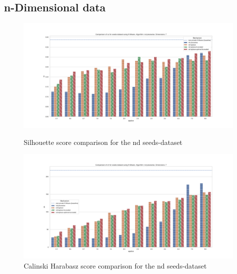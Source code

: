 \subsection{n-Dimensional data}
\begin{figure}[H]
    \centering
    \begin{minipage}[c]{0.8\textwidth}
        \includegraphics[width=1\textwidth]{Results/RQ2-nd/seeds-dataset/sc_seeds-dataset_comparison.png}
        \caption{Silhouette score comparison for the nd seeds-dataset}
        \label{fig:appendix-sc_seeds-dataset_comparison_nd}
    \end{minipage}
    \begin{minipage}[c]{0.8\textwidth}
        \includegraphics[width=1\textwidth]{Results/RQ2-nd/seeds-dataset/ch_seeds-dataset_comparison.png}
        \caption{Calinski Harabasz score comparison for the nd seeds-dataset}
        \label{fig:appendix-ch_seeds-dataset_comparison_nd}
    \end{minipage}

\end{figure}
